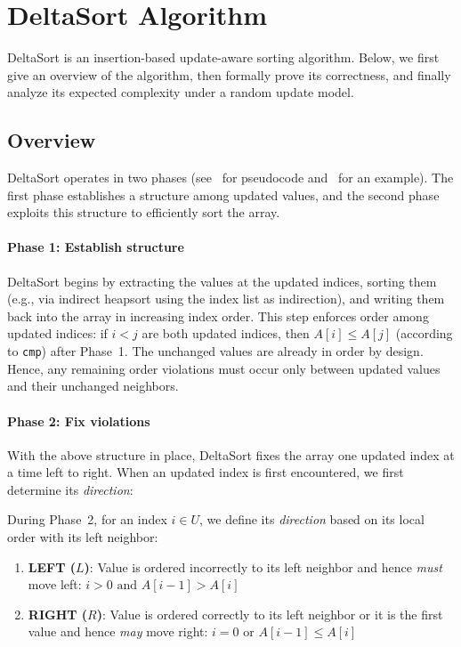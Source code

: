 \section{DeltaSort Algorithm}
\label{sec:algorithm}

DeltaSort is an insertion-based update-aware sorting algorithm. Below, we first give an overview of the algorithm, then formally prove its correctness, and finally analyze its expected complexity under a random update model.

\subsection{Overview}

DeltaSort operates in two phases (see~ for pseudocode and~ for an example). The first phase establishes a structure among updated values, and the second phase exploits this structure to efficiently sort the array.

\paragraph{Phase 1: Establish structure} DeltaSort begins by extracting the values at the updated indices, sorting them (e.g., via indirect heapsort using the index list as indirection), and writing them back into the array in increasing index order. This step enforces order among updated indices: if $i < j$ are both updated indices, then $A[i] \le A[j]$ (according to \texttt{cmp}) after Phase~1. The unchanged values are already in order by design. Hence, any remaining order violations must occur only between updated values and their unchanged neighbors.

\paragraph{Phase 2: Fix violations}
With the above structure in place, DeltaSort fixes the array one updated index at a time left to right. When an updated index is first encountered, we first determine its \emph{direction}:



\begin{definition}[Direction]
\label{def:direction}
During Phase~2, for an index $i \in U$, we define its \emph{direction} based on its local order with its left neighbor:
\begin{enumerate}
  \item \textbf{LEFT ($L$)}: Value is ordered incorrectly to its left neighbor and hence \emph{must} move left: $i > 0 \text{ and } A[i-1] > A[i]$
  \item \textbf{RIGHT ($R$)}: Value is ordered correctly to its left neighbor or it is the first value and hence \emph{may} move right: $i = 0 \text{ or } A[i-1] \le A[i]$
\end{enumerate}
\end{definition}

